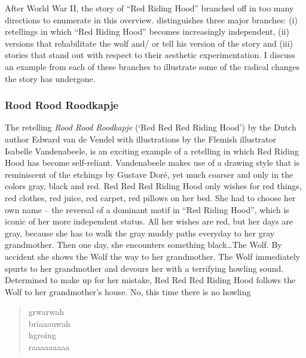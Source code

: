 After World War II, the story of ``Red Riding Hood'' branched off in too many directions to enumerate in this overview. \citeauthor{zipes:1993} distinguishes three major branches: (i) retellings in which ``Red Riding Hood'' becomes increasingly independent, (ii) versions that rehabilitate the wolf and/ or tell his version of the story and (iii) stories that stand out with respect to their aesthetic experimentation\autocite[59]{zipes:1993}. I discuss an example from each of these branches to illustrate some of the radical changes the story has undergone.

\subsubsection*{Rood Rood Roodkapje}
The retelling \emph{Rood Rood Roodkapje} (`Red Red Red Riding Hood') by the Dutch author Edward van de Vendel with illustrations by the Flemish illustrator Isabelle Vandenabeele, is an exciting example of a retelling in which Red Riding Hood has become self-reliant\autocite{vendel:2003}. Vandenabeele makes use of a drawing style that is reminiscent of the etchings by Gustave Doré, yet much coarser and only in the colors gray, black and red. Red Red Red Riding Hood only wishes for red things, red clothes, red juice, red carpet, red pillows on her bed. She had to choose her own name -- the reversal of a dominant motif in ``Red Riding Hood'', which is iconic of her more independent status. All her wishes are red, but her days are gray, because she has to walk the gray muddy paths everyday to her gray grandmother. Then one day, she encounters something black\ldots The Wolf. By accident she shows the Wolf the way to her grandmother. The Wolf immediately spurts to her grandmother and devours her with a terrifying howling sound. Determined to make up for her mistake, Red Red Red Riding Hood follows the Wolf to her grandmother's house. No, this time there is no howling 

\begin{quotation}
\noindent
{\fontsize{2cm}{1em}\selectfont%
grwarwah\vspace{0.5cm}\\
briaaauwah\vspace{0.5cm}\\
hgroing\vspace{0.5cm}\\
raaaaaaaaa\vspace{0.5cm}\\}
\end{quotation}

